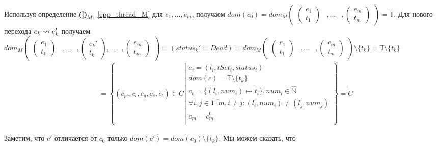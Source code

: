 Используя определение $\mathrel{\bigoplus}_M$~\ref{epp_thread_M} 
для $e_1, \dots, e_m$, получаем
$dom(c_0) = dom_M\begin{pmatrix}
\begin{pmatrix}
e_1 \\
t_1 
\end{pmatrix}& ,
\dots& ,
\begin{pmatrix}
e_m \\
t_m 
\end{pmatrix}
\end{pmatrix} = \mathbb{T}$.
Для нового перехода $e_k \leadsto e_k'$ получаем $dom_M\begin{pmatrix}
\begin{pmatrix}
e_1 \\
t_1 
\end{pmatrix}& ,
\dots& ,
\begin{pmatrix}
e_k' \\
t_k 
\end{pmatrix} ,
\dots& ,
\begin{pmatrix}
e_m \\
t_m 
\end{pmatrix}
\end{pmatrix} = (status_k' = Dead) = dom_M\begin{pmatrix}
\begin{pmatrix}
e_1 \\
t_1 
\end{pmatrix}& ,
\dots& ,
\begin{pmatrix}
e_m \\
t_m 
\end{pmatrix}
\end{pmatrix} \setminus \{t_k\} = \mathbb{T} \setminus \{t_k\}$
\begin{align}
& = \left\lbrace (c_{pc},c_l,c_g,c_s, c_t) \in C 
\left| 
\begin{array}{c}
e_i = (l_i, tSet_i, status_i) \\
dom(c) = \mathbb{T} \setminus \{t_k\} \\
c_t = \{(l_i, num_i) \mapsto t_i\}, num_i \in \widehat{\mathbb{N}} \\
\forall i, j \in \overline{1..m}, i \neq j: (l_i, num_i) \neq (l_j, num_j)\\
c_m = c^0_m \\
\end{array}
\right.
\right\rbrace = \tilde{C} \nonumber
\end{align}

Заметим, что $c'$ отличается от $c_0$ только $dom(c') = dom(c_0) \setminus \{t_k\}$.
Мы можем сказать, что

